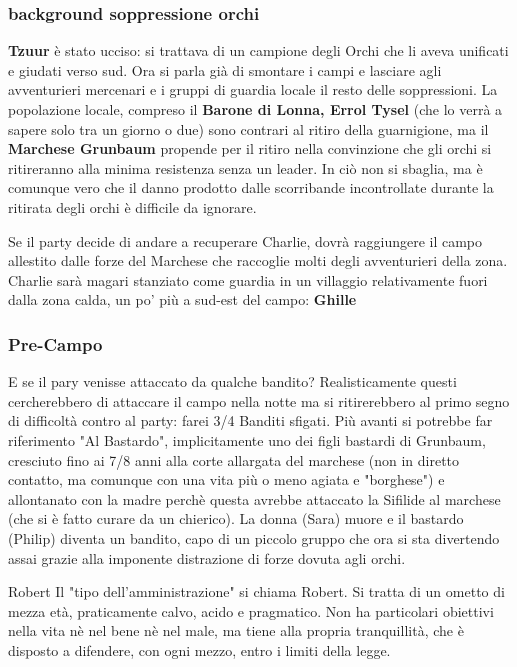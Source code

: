 \documentclass[10pt,twoside, twocolumn, openany]{dndbook}
\begin{document}
\subsubsection{background soppressione orchi}
\textbf{Tzuur} è stato ucciso: si trattava di un campione degli Orchi che li aveva unificati e giudati verso sud. Ora si parla già di smontare i campi e lasciare agli avventurieri mercenari e i gruppi di guardia locale il resto delle soppressioni.
La popolazione locale, compreso il \textbf{Barone di Lonna, Errol Tysel} (che lo verrà a sapere solo tra un giorno o due) sono contrari al ritiro della guarnigione, ma il \textbf{Marchese Grunbaum} propende per il ritiro nella convinzione che gli orchi si ritireranno alla minima resistenza senza un leader.
In ciò non si sbaglia, ma è comunque vero che il danno prodotto dalle scorribande incontrollate durante la ritirata degli orchi è difficile da ignorare.

Se il party decide di andare a recuperare Charlie, dovrà raggiungere il campo allestito dalle forze del Marchese che raccoglie molti degli avventurieri della zona. Charlie sarà magari stanziato come guardia in un villaggio relativamente fuori dalla zona calda, un po' più a sud-est del campo: \textbf{Ghille} 

\subsubsection{Pre-Campo}
E se il pary venisse attaccato da qualche bandito? Realisticamente questi cercherebbero di attaccare il campo nella notte ma si ritirerebbero al primo segno di difficoltà contro al party: farei 3/4 Banditi sfigati.
Più avanti si potrebbe far riferimento "Al Bastardo", implicitamente uno dei figli bastardi di Grunbaum, cresciuto fino ai 7/8 anni alla corte allargata del marchese (non in diretto contatto, ma comunque con una vita più o meno agiata e "borghese") e allontanato con la madre perchè questa avrebbe attaccato la Sifilide al marchese (che si è fatto curare da un chierico).
La donna (Sara) muore e il bastardo (Philip) diventa un bandito, capo di un piccolo gruppo che ora si sta divertendo assai grazie alla imponente distrazione di forze dovuta agli orchi.

\begin{DndSidebar}[float=t]{Robert}
  Il "tipo dell'amministrazione" si chiama Robert. Si tratta di un ometto di mezza età, praticamente calvo, acido e pragmatico. Non ha particolari obiettivi nella vita nè nel bene nè nel male, ma tiene alla propria tranquillità, che è disposto a difendere, con ogni mezzo, entro i limiti della legge.
\end{DndSidebar}
\end{document}
